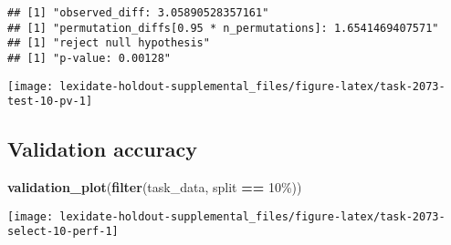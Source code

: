 \documentclass[
]{book}
\newenvironment{Shaded}{\begin{snugshade}}{\end{snugshade}}
\newcommand{\AttributeTok}[1]{\textcolor[rgb]{0.13,0.29,0.53}{#1}}
\newcommand{\DecValTok}[1]{\textcolor[rgb]{0.00,0.00,0.81}{#1}}
\newcommand{\FunctionTok}[1]{\textcolor[rgb]{0.13,0.29,0.53}{\textbf{#1}}}
\newcommand{\NormalTok}[1]{#1}
\newcommand{\OtherTok}[1]{\textcolor[rgb]{0.56,0.35,0.01}{#1}}
\newcommand{\SpecialCharTok}[1]{\textcolor[rgb]{0.81,0.36,0.00}{\textbf{#1}}}
\newcommand{\StringTok}[1]{\textcolor[rgb]{0.31,0.60,0.02}{#1}}
\begin{document}
\begin{Shaded}
\end{Shaded}

\begin{verbatim}
## [1] "observed_diff: 3.05890528357161"
## [1] "permutation_diffs[0.95 * n_permutations]: 1.6541469407571"
## [1] "reject null hypothesis"
## [1] "p-value: 0.00128"
\end{verbatim}

\texttt{[image: lexidate-holdout-supplemental\_files/figure-latex/task-2073-test-10-pv-1]}

\hypertarget{validation-accuracy-41}{%
\subsection{Validation accuracy}\label{validation-accuracy-41}}

\begin{Shaded}
\begin{Highlighting}[]
\FunctionTok{validation\_plot}\NormalTok{(}\FunctionTok{filter}\NormalTok{(task\_data, split }\SpecialCharTok{==} \StringTok{\textquotesingle{}10\%\textquotesingle{}}\NormalTok{))}
\end{Highlighting}
\end{Shaded}

\texttt{[image: lexidate-holdout-supplemental\_files/figure-latex/task-2073-select-10-perf-1]}
\end{document}
